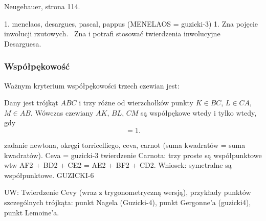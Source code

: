 \begin{proposition}
	Neugebauer, strona 114.
\end{proposition}






1. menelaos, desargues, pascal, pappus (MENELAOS = guzicki-3)
1. Zna pojęcie inwolucji rzutowych.   Zna i potrafi stosować twierdzenia inwolucyjne Desarguesa.  
 
\subsubsection{Współpękowość}

Ważnym kryterium współpękowości trzech czewian jest:

\begin{proposition}
	Dany jest trójkąt $ABC$ i trzy różne od wierzchołków punkty $K \in BC$, $L \in CA$, $M \in AB$.
	Wówczas czewiany $AK$, $BL$, $CM$ są współpękowe wtedy i tylko wtedy, gdy
	\begin{equation}
		[AMB] [BKC] [CLA] = 1.
	\end{equation}
\end{proposition}






zadanie newtona, okręgi torricelliego, ceva, carnot (suma kwadratów = suma kwadratów). Ceva = guzicki-3
twierdzenie Carnota: trzy proste są współpunktowe wtw AF2 + BD2 + CE2 = AE2 + BF2 + CD2. Wniosek: symetralne są współpunktowe. GUZICKI-6



UW: Twierdzenie Cevy (wraz z trygonometryczną wersją), przykłady punktów szczególnych trójkąta: punkt Nagela (Guzicki-4), punkt Gergonne'a (guzicki4), punkt Lemoine'a.




